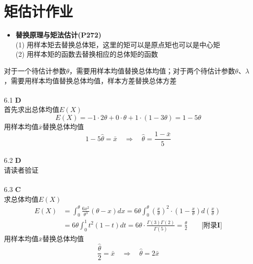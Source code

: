 \documentclass[a4paper]{ctexart}    %
\begin{document}
	\section{矩估计作业}
	\begin{tcolorbox}
		[
		colframe=blue!25,
		colback=blue!10,
		coltitle=blue!20!black,  
		fonttitle=\bfseries,
		adjusted title=Formula Or Theorem:
		]
		\begin{itemize}
			\item \textbf{替换原理与矩法估计(P272)} \\
			(1) 用样本矩去替换总体矩，这里的矩可以是原点矩也可以是中心矩 \\
			(2) 用样本矩的函数去替换相应的总体矩的函数
		\end{itemize}
	\end{tcolorbox}
	\noindent
	对于一个待估计参数$ \theta $，需要用样本均值替换总体均值；对于两个待估计参数$ \theta $、$ \lambda $，需要用样本均值替换总体均值，样本方差替换总体方差\\ \\
	6.1 \quad \textbf{D} \\
	首先求出总体均值$ E(X) $
	\begin{equation*}
		E(X) = -1 \cdot 2\theta + 0 \cdot \theta + 1 \cdot (1-3\theta) = 1 - 5 \theta
	\end{equation*}
	用样本均值$ \bar{x} $替换总体均值
	\begin{equation*}
		1 - 5\hat{\theta} = \bar{x} \quad \Rightarrow \quad \hat{\theta} = \frac{1-\bar{x}}{5}
	\end{equation*}
	\\
	6.2 \quad \textbf{D} \\
	请读者验证 \\ \\
	6.3 \quad \textbf{C} \\
	求总体均值$ E(X) $ 
	\begin{equation*}
		\begin{split}
			E(X) &= \int_{0}^{\theta} \frac{6x^2}{\theta^3}(\theta - x)dx = 6\theta \int_{0}^{\theta} \left(\frac{x}{\theta}\right)^2 \cdot \left(1-\frac{x}{\theta}\right)d\left(\frac{x}{\theta}\right) \\
			&= 6\theta \int_{0}^{1}t^2(1-t)dt = 6\theta \cdot \frac{\Gamma(3)\Gamma(2)}{\Gamma(5)} = \frac{\theta}{2} \qquad \textbf{[附录I]}
		\end{split}
	\end{equation*}
	用样本均值$ \bar{x} $替换总体均值
	\begin{equation*}
		\frac{\hat{\theta}}{2} = \bar{x} \quad \Rightarrow \quad \hat{\theta} = 2\bar{x}
	\end{equation*}
\end{document}
